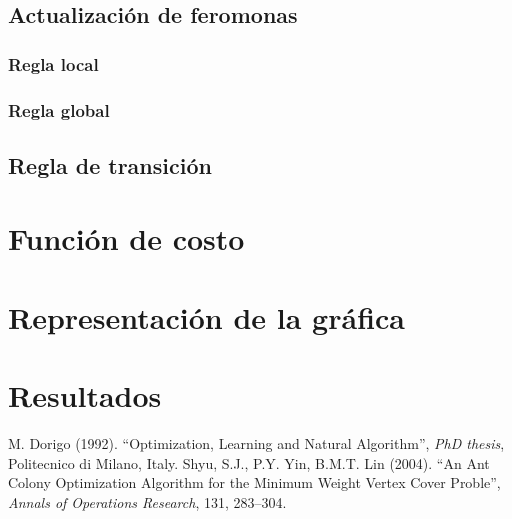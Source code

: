 \documentclass[12pt, letterpaper]{article}
\begin{document}
\subsection{Actualización de feromonas}

\subsubsection{Regla local}

\subsubsection{Regla global}

\subsection{Regla de transición}

\section{Función de costo}

\section{Representación de la gráfica}

\section{Resultados}



\begin{thebibliography}{2}
M. Dorigo (1992). ``Optimization, Learning and Natural Algorithm'', \textit{PhD thesis}, Politecnico di Milano, Italy.
Shyu, S.J., P.Y. Yin, B.M.T. Lin (2004). ``An Ant Colony Optimization Algorithm for the Minimum Weight Vertex Cover Proble'', \textit{Annals of Operations Research}, 131, 283–304.
\end{thebibliography}
\end{document}
